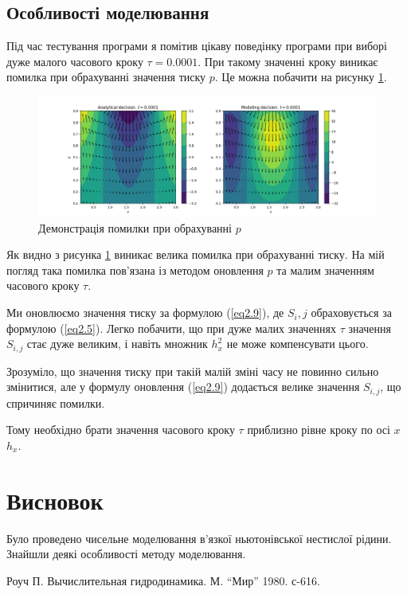 \documentclass[a4paper,12pt]{article}
\begin{document}
\subsection{Особливості моделювання}

Під час тестування програми я помітив цікаву поведінку програми при виборі дуже малого часового кроку $\tau = 0.0001$. При такому значенні кроку виникає помилка при обрахуванні значення тиску $p$. Це можна побачити на рисунку \ref{ris:3}.

\begin{figure}[h]
	\center \includegraphics[scale=0.5]{Figure_3.png}
	\caption{Демонстрація помилки при обрахуванні $p$} \label{ris:3}
\end{figure}

Як видно з рисунка \ref{ris:3} виникає велика помилка при обрахуванні тиску. На мій погляд така помилка пов'язана із методом оновлення $p$ та малим значенням часового кроку $\tau$. 

Ми оновлюємо значення тиску за формулою (\ref{eq2.9}), де $S_i,j$ обраховується за формулою (\ref{eq2.5}). Легко побачити, що при дуже малих значеннях $\tau$ значення $S_{i,j}$ стає дуже великим, і навіть множник $h_x^2$ не може компенсувати цього.

Зрозуміло, що значення тиску при такій малій зміні часу не повинно сильно змінитися, але у формулу оновлення (\ref{eq2.9}) додається велике значення $S_{i,j}$, що спричиняє помилки.

Тому необхідно брати значення часового кроку $\tau$ приблизно рівне кроку по осі $x$ $h_x$.

\section{Висновок}

Було проведено чисельне моделювання в’язкої ньютонівської нестислої рідини. Знайшли деякі особливості методу моделювання.


\begin{thebibliography}{}
	 Роуч П. Вычислительная гидродинамика. М. “Мир” 1980. с-616.
\end{thebibliography}
\end{document}
